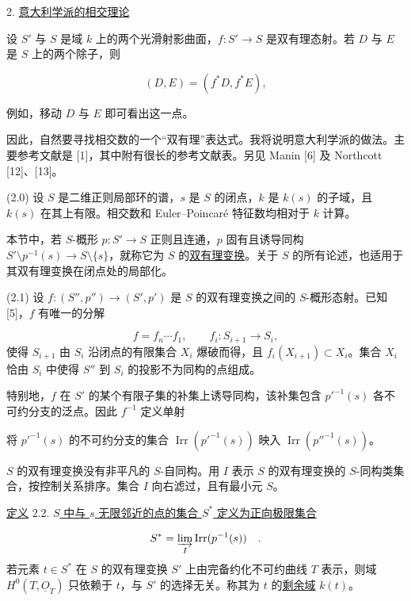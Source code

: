 2. \underline{意大利学派的相交理论}

设 $S'$ 与 $S$ 是域 $k$ 上的两个光滑射影曲面，$f:S'\longrightarrow S$ 是双有理态射。若 $D$ 与 $E$ 是 $S$ 上的两个除子，则

\begin{equation*}
(D,E)=(f^*D,f^*E),
\end{equation*}


例如，移动 $D$ 与 $E$ 即可看出这一点。

因此，自然要寻找相交数的一个“双有理”表达式。我将说明意大利学派的做法。主要参考文献是 [1]，其中附有很长的参考文献表。另见 Manin [6] 及 Northcott [12]、[13]。

(2.0) 设 $S$ 是二维正则局部环的谱，$s$ 是 $S$ 的闭点，$k$ 是 $k(s)$ 的子域，且 $k(s)$ 在其上有限。相交数和 Euler--Poincaré 特征数均相对于 $k$ 计算。

本节中，若 $S$-概形 $p:S'\longrightarrow S$ 正则且连通，$p$ 固有且诱导同构 $S'\setminus p^{-1}(s)\longrightarrow S\setminus\{s\}$，就称它为 $S$ 的\underline{双有理变换}。关于 $S$ 的所有论述，也适用于其双有理变换在闭点处的局部化。

(2.1) 设 $f:(S'',p'')\longrightarrow(S',p')$ 是 $S$ 的双有理变换之间的 $S$-概形态射。已知 [5]，$f$ 有唯一的分解

\begin{equation*}
f=f_n\cdots f_1,\qquad f_i:S_{i+1}\longrightarrow S_i,
\end{equation*}
使得 $S_{i+1}$ 由 $S_i$ 沿闭点的有限集合 $X_i$ 爆破而得，且 $f_i(X_{i+1})\subset X_i$。集合 $X_i$ 恰由 $S_i$ 中使得 $S''$ 到 $S_i$ 的投影不为同构的点组成。

特别地，$f$ 在 $S'$ 的某个有限子集的补集上诱导同构，该补集包含 $p'^{-1}(s)$ 各不可约分支的泛点。因此 $f^{-1}$ 定义单射


将 $p'^{-1}(s)$ 的不可约分支的集合 $\operatorname{Irr}(p'^{-1}(s))$ 映入 $\operatorname{Irr}(p''^{-1}(s))$。

$S$ 的双有理变换没有非平凡的 $S$-自同构。用 $I$ 表示 $S$ 的双有理变换的 $S$-同构类集合，按控制关系排序。集合 $I$ 向右滤过，且有最小元 $S$。

\underline{定义} 2.2. \underline{$S$ 中与 $s$ 无限邻近的点的集合 $S^*$ 定义为正向极限集合}

\begin{equation*}
S^*=\varinjlim_I\operatorname{Irr}(p^{-1}(s)) \quad .
\end{equation*}
若元素 $t\in S^*$ 在 $S$ 的双有理变换 $S'$ 上由完备约化不可约曲线 $T$ 表示，则域 $H^0(T,\underline{O}_T)$ 只依赖于 $t$，与 $S'$ 的选择无关。称其为 $t$ 的\underline{剩余域} $k(t)$。


